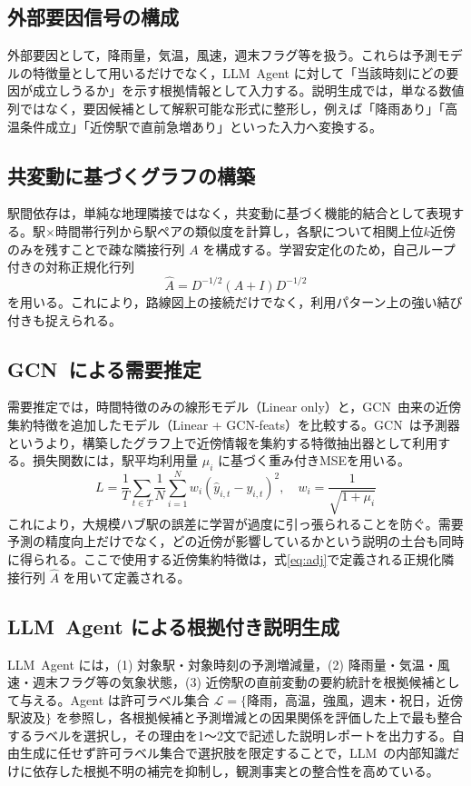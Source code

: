 \documentclass[technicalreport]{ieicej}
\newcommand{\LLM}{LLM}
\newcommand{\GCN}{GCN}
\begin{document}
\subsection{外部要因信号の構成}
外部要因として，降雨量，気温，風速，週末フラグ等を扱う。これらは予測モデルの特徴量として用いるだけでなく，\LLM\ Agent に対して「当該時刻にどの要因が成立しうるか」を示す根拠情報として入力する。説明生成では，単なる数値列ではなく，要因候補として解釈可能な形式に整形し，例えば「降雨あり」「高温条件成立」「近傍駅で直前急増あり」といった入力へ変換する。

\subsection{共変動に基づくグラフの構築}
駅間依存は，単純な地理隣接ではなく，共変動に基づく機能的結合として表現する。駅$\times$時間帯行列から駅ペアの類似度を計算し，各駅について相関上位$k$近傍のみを残すことで疎な隣接行列 $A$ を構成する。学習安定化のため，自己ループ付きの対称正規化行列
\begin{equation}
\hat{A}=D^{-1/2}(A+I)D^{-1/2}
\label{eq:adj}
\end{equation}
を用いる。これにより，路線図上の接続だけでなく，利用パターン上の強い結び付きも捉えられる。

\subsection{\GCN\ による需要推定}
需要推定では，時間特徴のみの線形モデル（Linear only）と，\GCN\ 由来の近傍集約特徴を追加したモデル（Linear + GCN-feats）を比較する。\GCN\ は予測器というより，構築したグラフ上で近傍情報を集約する特徴抽出器として利用する。損失関数には，駅平均利用量 $\mu_i$ に基づく重み付きMSEを用いる。
\begin{equation}
L=\frac{1}{T}\sum_{t\in T}\frac{1}{N}\sum_{i=1}^{N} w_i(\hat{y}_{i,t}-y_{i,t})^2,
\quad
w_i=\frac{1}{\sqrt{1+\mu_i}}
\label{eq:wmse}
\end{equation}
これにより，大規模ハブ駅の誤差に学習が過度に引っ張られることを防ぐ。需要予測の精度向上だけでなく，どの近傍が影響しているかという説明の土台も同時に得られる。ここで使用する近傍集約特徴は，式\eqref{eq:adj}で定義される正規化隣接行列 $\hat{A}$ を用いて定義される。

\subsection{\LLM\ Agent による根拠付き説明生成}
\LLM\ Agent には，(1) 対象駅・対象時刻の予測増減量，(2) 降雨量・気温・風速・週末フラグ等の気象状態，(3) 近傍駅の直前変動の要約統計を根拠候補として与える。Agent は許可ラベル集合 $\mathcal{L} = \{$降雨，高温，強風，週末・祝日，近傍駅波及$\}$ を参照し，各根拠候補と予測増減との因果関係を評価した上で最も整合するラベルを選択し，その理由を1〜2文で記述した説明レポートを出力する。自由生成に任せず許可ラベル集合で選択肢を限定することで，\LLM\ の内部知識だけに依存した根拠不明の補完を抑制し，観測事実との整合性を高めている。
\end{document}
